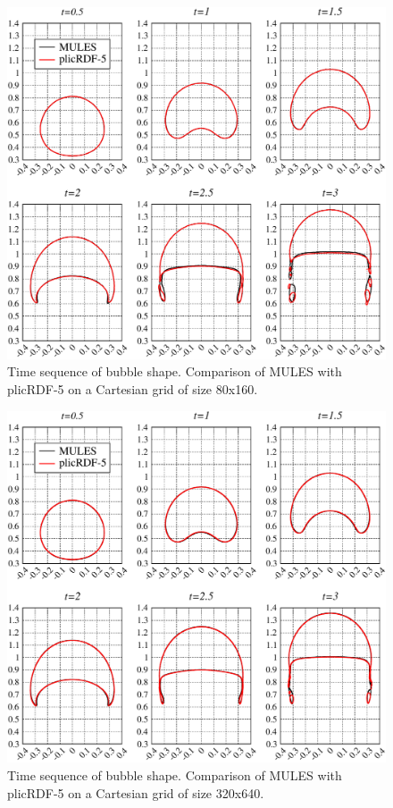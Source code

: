 \documentclass[review]{elsarticle}
\begin{document}
\begin{figure}[!h]
  \includegraphics[width=\textwidth]{figures/bubble_shape_time_evol_uns080_MULES_vs_plicRDF5.pdf}
  \caption{Time sequence of bubble shape. Comparison of MULES with plicRDF-5 on a Cartesian grid of size 80x160.}
  \label{fig:HB_bubble_shape_time_evol_uns080_MULES_vs_plicRDF5}
\end{figure}

\begin{figure}[!h]
  \includegraphics[width=\textwidth]{figures/bubble_shape_time_evol_uns320_MULES_vs_plicRDF5.pdf}
  \caption{Time sequence of bubble shape. Comparison of MULES with plicRDF-5 on a Cartesian grid of size 320x640.}
  \label{fig:HB_bubble_shape_time_evol_uns320_MULES_vs_plicRDF5}
\end{figure}
\end{document}
